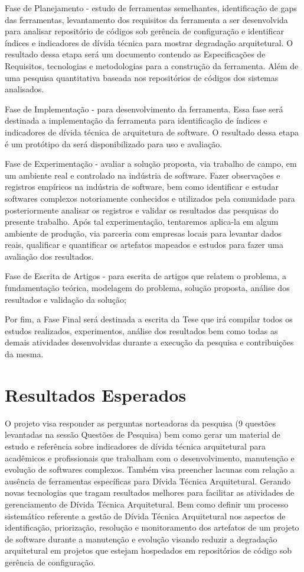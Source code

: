 \documentclass[
	12pt,				%
	openright,			%
	twoside,			%
	a4paper,			%
	english,			%
	french,				%
	spanish,			%
	brazil,				%
	]{abntex2}
\begin{document}
Fase de Planejamento - estudo de ferramentas semelhantes, identificação
de gaps das ferramentas, levantamento dos requisitos da ferramenta
a ser desenvolvida para analisar repositório de códigos sob gerência
de configuração e identificar índices e indicadores de dívida técnica
para mostrar degradação arquitetural. O resultado dessa etapa será
um documento contendo as Especificações de Requisitos, tecnologias
e metodologias para a construção da ferramenta. Além de uma pesquisa
quantitativa baseada nos repositórios de códigos dos sistemas analisados.

Fase de Implementação - para desenvolvimento da ferramenta. Essa fase
será destinada a implementação da ferramenta para identificação de
índices e indicadores de dívida técnica de arquitetura de software.
O resultado dessa etapa é um protótipo da será disponibilizado para
uso e avaliação. 

Fase de Experimentação - avaliar a solução proposta, via trabalho
de campo, em um ambiente real e controlado na indústria de software.
Fazer observações e registros empíricos na indústria de software,
bem como identificar e estudar softwares complexos notoriamente conhecidos
e utilizados pela comunidade para posteriormente analisar os registros
e validar os resultados das pesquisas do presente trabalho. Após tal
experimentação, tentaremos aplica-la em algum ambiente de produção,
via parceria com empresas locais para levantar dados reais, qualificar
e quantificar os artefatos mapeados e estudos para fazer uma avaliação
dos resultados. 

Fase de Escrita de Artigos - para escrita de artigos que relatem o
problema, a fundamentação teórica, modelagem do problema, solução
proposta, análise dos resultados e validação da solução; 

Por fim, a Fase Final será destinada a escrita da Tese que irá compilar
todos os estudos realizados, experimentos, análise dos resultados
bem como todas as demais atividades desenvolvidas durante a execução
da pesquisa e contribuições da mesma.

\chapter{Resultados Esperados}

O projeto visa responder as perguntas norteadoras da pesquisa (9 questões
levantadas na sessão Questões de Pesquisa) bem como gerar um material
de estudo e referência sobre indicadores de dívida técnica arquitetural
para acadêmicos e profissionais que trabalham com o desenvolvimento,
manutenção e evolução de softwares complexos. Também visa preencher
lacunas com relação a ausência de ferramentas específicas para Dívida
Técnica Arquitetural. Gerando novas tecnologias que tragam resultados
melhores para facilitar as atividades de gerenciamento de Dívida Técnica
Arquitetural. Bem como definir um processo sistemático referente a
gestão de Dívida Técnica Arquitetural nos aspectos de identificação,
priorização, resolução e monitoramento dos artefatos de um projeto
de software durante a manutenção e evolução visando reduzir a degradação
arquitetural em projetos que estejam hospedados em repositórios de
código sob gerência de configuração. 
\end{document}

